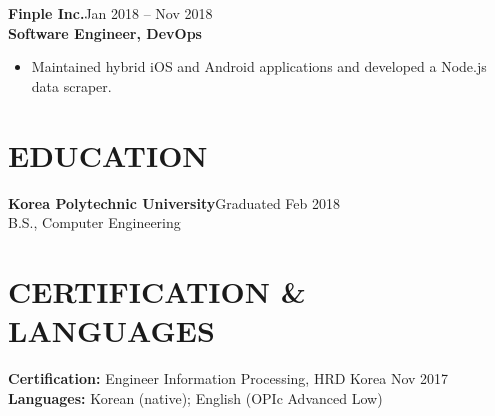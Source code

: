\documentclass[a4paper,10pt]{article}
\newcommand{\employer}[3]{\vspace{5pt}\textbf{\color{accent}#1}\hfill{\small\color{muted}#2}\\\textbf{#3}\par}
\begin{document}
\employer{Finple Inc.}{Jan 2018 -- Nov 2018}{Software Engineer, DevOps}
\begin{itemize}
\item Maintained hybrid iOS and Android applications and developed a Node.js data scraper.
\end{itemize}

\section{EDUCATION}
\textbf{Korea Polytechnic University}\hfill{\small\color{muted}Graduated Feb 2018}\\
B.S., Computer Engineering

\section{CERTIFICATION \& LANGUAGES}
\textbf{Certification:} Engineer Information Processing, HRD Korea \hfill{\small\color{muted}Nov 2017}\\
\textbf{Languages:} Korean (native); English (OPIc Advanced Low)
\end{document}
